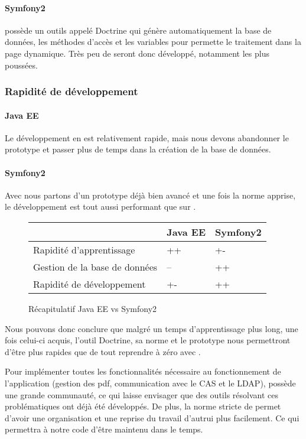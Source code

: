 \paragraph{Symfony2}
\symfony possède un outils appelé Doctrine qui génère automatiquement la base de données, les méthodes d'accès et les variables pour permette le traitement dans la page dynamique. Très peu de seront donc développé, notamment les plus poussées.

\subsubsection{Rapidité de développement}
\paragraph{Java EE}
Le développement en \jee est relativement rapide, mais nous devons abandonner le prototype et passer plus de temps dans la création de la base de données.

\paragraph{Symfony2}
Avec \symfony nous partons d'un prototype déjà bien avancé et une fois la norme apprise, le développement est tout aussi performant que sur \jee.

\begin{figure}[H]
\begin{center}
\begin{tabular}{|m{180pt}|m{50pt}|m{50pt}|}
	\hline
	\null & \textbf{Java EE} & \textbf{Symfony2} \\
	\hline
	Rapidité d'apprentissage & ++ & +-\\
	\hline
	Gestion de la base de données & -- & ++\\
	\hline
	Rapidité de développement & +- & ++ \\
	\hline
\end{tabular} \vspace*{5mm}
\caption{Récapitulatif Java EE vs Symfony2}
\end{center}
\end{figure}
Nous pouvons donc conclure que malgré un temps d'apprentissage plus long, une fois celui-ci acquis, l'outil Doctrine, sa norme et le prototype nous permettront d'être plus rapides que de tout reprendre à zéro avec \jee.

Pour implémenter toutes les fonctionnalités nécessaire au fonctionnement de l'application (gestion des pdf, communication avec le CAS et le LDAP), \symfony possède une grande communauté, ce qui laisse envisager que des outils résolvant ces problématiques ont déjà été développés.
De plus, la norme stricte de \symfony permet d'avoir une organisation et une reprise du travail d'autrui plus facilement. Ce qui permettra à notre code d'être maintenu dans le temps.\

